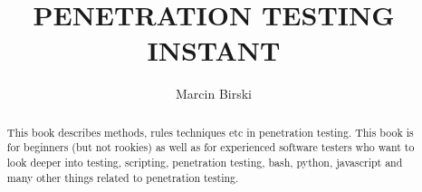 \documentclass{article}[12pt]
\title{\huge{PENETRATION TESTING INSTANT}}
\author{Marcin Birski}
\begin{document}
    \begin{center}
        \maketitle
        \newpage
    \end{center}

    \begin{abstract}
        This book describes methods, rules techniques etc in penetration testing.
        This book is for beginners (but not rookies) as well as for experienced software testers who want to look deeper into testing, scripting, penetration testing, bash, python, javascript and many other things related to penetration testing.
    \end{abstract}

    \tableofcontents
    \newpage





    
    
    
    
    
    
    
    
    
    
    





    
    
\end{document}
